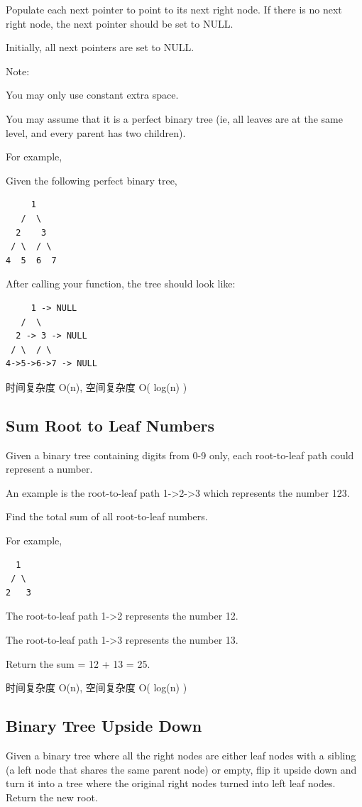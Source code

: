 \documentclass[12pt]{book}
\begin{document}
Populate each next pointer to point to its next right node. If there is no next right node, the next pointer should be set to NULL.

Initially, all next pointers are set to NULL.

Note:

You may only use constant extra space.

You may assume that it is a perfect binary tree (ie, all leaves are at the same level, and every parent has two children).

For example,

Given the following perfect binary tree,
\lstset{language=java,label= ,caption= ,numbers=none}
\begin{lstlisting}
     1
   /  \
  2    3
 / \  / \
4  5  6  7
\end{lstlisting}

After calling your function, the tree should look like:
\lstset{language=java,label= ,caption= ,numbers=none}
\begin{lstlisting}
     1 -> NULL
   /  \
  2 -> 3 -> NULL
 / \  / \
4->5->6->7 -> NULL
\end{lstlisting}

时间复杂度 O(n), 空间复杂度 O( log(n) )


\subsection{Sum Root to Leaf Numbers}
\label{sec-4-4-7}
Given a binary tree containing digits from 0-9 only, each root-to-leaf path could represent a number.

An example is the root-to-leaf path 1->2->3 which represents the number 123.

Find the total sum of all root-to-leaf numbers.

For example,
\lstset{language=java,label= ,caption= ,numbers=none}
\begin{lstlisting}
  1
 / \
2   3
\end{lstlisting}

The root-to-leaf path 1->2 represents the number 12.

The root-to-leaf path 1->3 represents the number 13.

Return the sum = 12 + 13 = 25.

时间复杂度 O(n), 空间复杂度 O( log(n) )


\subsection{Binary Tree Upside Down}
\label{sec-4-4-8}
Given a binary tree where all the right nodes are either leaf nodes with a sibling (a left node that shares the same parent node) or empty, flip it upside down and turn it into a tree where the original right nodes turned into left leaf nodes. Return the new root.
\end{document}
